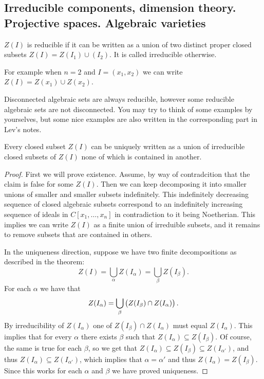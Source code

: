 \documentclass[11pt,a4paper]{article}
\begin{document}
\subsection{Irreducible components,  dimension theory.
  Projective spaces. Algebraic varieties}

\begin{definition}
  $Z(I)$ is reducible if it can be written as a union of two distinct
  proper closed subsets $Z(I) = Z(I_1) \cup (I_2)$.
  It is called irreducible otherwise.
\end{definition}

\begin{example}
  For example when $n = 2$ and $I = (x_1,x_2)$
  we can write $Z(I) = Z(x_1) \cup Z(x_2)$.
\end{example}

\begin{remark}
  Disconnected algebraic sets are always reducible,
  however some reducible algebraic sets are not disconnected.
  You may try to think of some examples by yourselves, but some nice
  examples are also written in the corresponding part in Lev's notes.
\end{remark}

\begin{theorem}
  Every closed subset $Z(I)$ can be uniquely written as a union of irreducible
  closed subsets of $Z(I)$ none of which is contained in another.
\end{theorem}
\begin{proof}
  First we will prove existence.
  Assume, by way of contradcition that the claim is false for some $Z(I)$.
  Then we can keep decomposing it into smaller unions of smaller and smaller
  subsets indefinitely.
  This indefinitely decreasing sequence of closed algebraic subsets
  correspond to an indefinitely increasing sequence of ideals in
  $C[x_1,\dots,x_n]$ in contradiction to it being Noetherian.
  This implies we can write $Z(I)$ as a finite union of irreduible subsets,
  and it remains to remove subsets that are contained in others.

  In the uniqueness direction, suppose we have two finite decompositions
  as described in the theorem:
  \[
    Z(I) =
    \bigcup_{\alpha} Z(I_{\alpha}) =
    \bigcup_{\beta} Z(I_{\beta}).
  \]
  For each $\alpha$ we have that
  \[
    Z(I_{\alpha}) =
    \bigcup_{\beta} \del{Z(I_{\beta}) \cap Z(I_{\alpha})}.
  \]
  By irreducibility of $Z(I_{\alpha})$ one of $Z(I_{\beta}) \cap Z(I_{\alpha})$
  must equal $Z(I_{\alpha})$.
  This implies that for every $\alpha$ there exists $\beta$ such that
  $Z(I_{\alpha}) \subseteq Z(I_{\beta})$.
  Of course, the same is true for each $\beta$,
  so we get that $Z(I_{\alpha}) \subseteq Z(I_{\beta}) \subseteq Z(I_{\alpha'})$,
  and thus $Z(I_{\alpha}) \subseteq Z(I_{\alpha'})$, which implies
  that $\alpha = \alpha'$ and thus $Z(I_{\alpha}) = Z(I_{\beta})$.
  Since this works for each $\alpha$ and $\beta$ we have proved uniqueness.
\end{proof}
\end{document}
